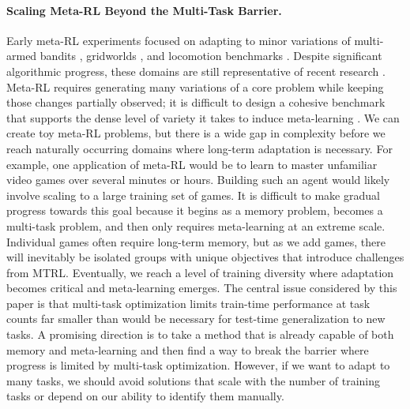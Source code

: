 \documentclass{article}
\begin{document}
\paragraph{Scaling Meta-RL Beyond the Multi-Task Barrier.} Early meta-RL experiments focused on adapting to minor variations of multi-armed bandits \cite{wang2016learning}, gridworlds \cite{stadie2018some}, and locomotion benchmarks \cite{rakelly2019efficient, finn2017model, rothfuss2018promp}. Despite significant algorithmic progress, these domains are still representative of recent research \cite{beck2024splagger, laskin2022context, ni2022recurrent, rimon2024mamba}. Meta-RL requires generating many variations of a core problem while keeping those changes partially observed; it is difficult to design a cohesive benchmark that supports the dense level of variety it takes to induce meta-learning \cite{team2023human, wang2021alchemy}. We can create toy meta-RL problems, but there is a wide gap in complexity before we reach naturally occurring domains where long-term adaptation is necessary. For example, one application of meta-RL would be to learn to master unfamiliar video games over several minutes or hours. Building such an agent would likely involve scaling to a large training set of games. It is difficult to make gradual progress towards this goal because it begins as a memory problem, becomes a multi-task problem, and then only requires meta-learning at an extreme scale. Individual games often require long-term memory, but as we add games, there will inevitably be isolated groups with unique objectives that introduce challenges from MTRL. Eventually, we reach a level of training diversity where adaptation becomes critical and meta-learning emerges. The central issue considered by this paper is that multi-task optimization limits train-time performance at task counts far smaller than would be necessary for test-time generalization to new tasks. A promising direction is to take a method that is already capable of both memory and meta-learning and then find a way to break the barrier where progress is limited by multi-task optimization. However, if we want to adapt to many tasks, we should avoid solutions that scale with the number of training tasks or depend on our ability to identify them manually.
\end{document}
